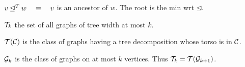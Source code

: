 \documentclass[12pt]{article}
\begin{document}
$v \unlhd^T w \quad \equiv\quad  v$ is an ancestor of $w$.  The root is the min wrt $\unlhd$.

${\cal T}_k$ the set of all graphs of tree width at most $k$.

${\cal T(C)}$ is the class of graphs having a tree decomposition whose torso is in ${\cal C}$.

${\cal G}_k$ is the class of graphs on at most $k$ vertices.  Thus ${\cal T}_k = {\cal T}({\cal
  G}_{k+1})$.
\end{document}

